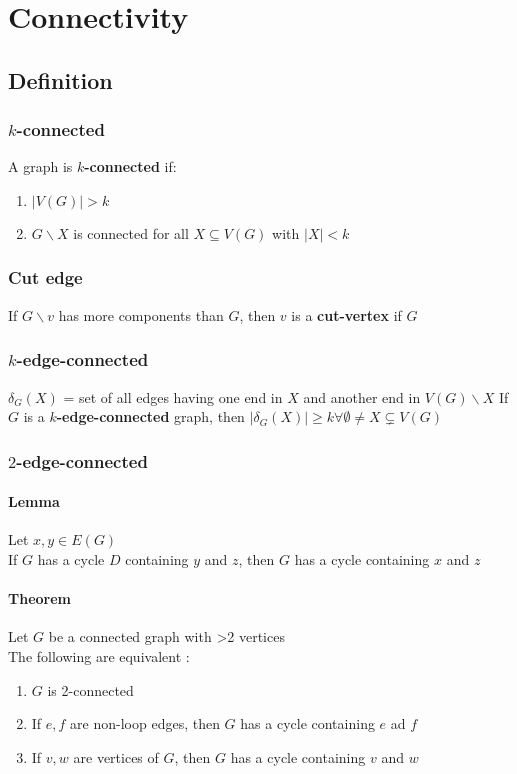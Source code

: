 \chapter{Connectivity}
    \section{Definition}
        \subsection{$k$-connected}
            A graph is \textbf{$k$-connected} if:\\
            \begin{enumerate}
                \item $|V(G)|>k$
                \item $G\backslash X$ is connected for all $X\subseteq V(G)$ with $|X|<k$
            \end{enumerate}
        \subsection{Cut edge}
            If $G\backslash v$ has more components than $G$, then $v$ is a \textbf{cut-vertex} if $G$
        \subsection{$k$-edge-connected}
            $\delta_G(X)$ = set of all edges having one end in $X$ and another end in $V(G)\backslash X$
            If $G$ is a \textbf{$k$-edge-connected} graph, then $|\delta_G(X)|\geq k \forall \emptyset \neq X \subsetneq V(G)$
        \subsection{$2$-edge-connected}
            \subsubsection{Lemma}
                Let $x, y\in E(G)$\\
                If $G$ has a cycle $D$ containing $y$ and $z$, then $G$ has a cycle containing $x$ and $z$
            \subsubsection{Theorem}
                Let $G$ be a connected graph with >2 vertices\\
                The following are equivalent :\\
                \begin{enumerate}
                    \item $G$ is 2-connected
                    \item If $e, f$ are non-loop edges, then $G$ has a cycle containing $e$ ad $f$
                    \item If $v, w$ are vertices of $G$, then $G$ has a cycle containing $v$ and $w$
                \end{enumerate}
